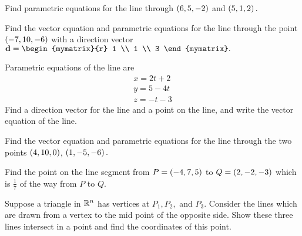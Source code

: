 \begin{enumialphparenastyle}
\begin{ex} Find parametric equations for the line through $\left(6 , 5 , -2 \right) $ 
and $\left(5 , 1 , 2 \right) .$ 
\end{ex} 
 

\begin{ex} Find the vector equation and parametric equations for the line through the point $\left(
-7, 10 , -6 \right) $ with a direction vector $\vect{d} = \begin{mymatrix}{r}
1 \\
1 \\
3
\end{mymatrix} .$ \vspace{1mm}
\end{ex} 

\begin{ex} Parametric equations of the line are 
\begin{equation*}
\begin{array}{c}
x = 2t+2\\
y = 5-4t\\
z= -t-3
\end{array}
\end{equation*}
 Find a direction vector for the line and a point on the line, and write the 
vector equation of the line. 
\end{ex} 


\begin{ex} Find the vector equation and parametric equations for the line through the two points $\left(
4, 10, 0 \right) $, $\left(1 , -5 , -6 \right) .$ 
\end{ex} 

\begin{ex} Find the point on the line segment from $P = \left(-4, 7, 5 \right) $
 to $Q = \left(2 , -2 , -3 \right) $ which is $\frac{1}{7}$ of the way from $P$ to $Q$.
\end{ex} 

\begin{ex} Suppose a triangle in $\mathbb{R}^{n}$  has vertices at $P_{1}, P_{2},$ and $P_{3}$. 
Consider the lines which are
drawn from a vertex to the mid point of the opposite side. Show these three
lines intersect in a point and find the coordinates of this point. 
\end{ex} 


\end{enumialphparenastyle}
